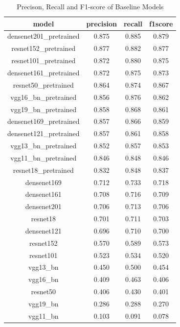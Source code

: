 \begin{table}[t]
  \centering
  \caption{Precison, Recall and F1-score of Baseline Models}
  \label{tabel:f1}
  \begin{tabular}{cccc}
    \hline
    \toprule
    model                   & precision & recall & f1score \\
    \midrule  %


    densenet201\_pretrained & 0.875     & 0.885  & 0.879   \\
    resnet152\_pretrained   & 0.877     & 0.882  & 0.877   \\
    resnet101\_pretrained   & 0.872     & 0.880  & 0.875   \\
    densenet161\_pretrained & 0.872     & 0.875  & 0.873   \\
    resnet50\_pretrained    & 0.864     & 0.874  & 0.867   \\
    vgg16\_bn\_pretrained   & 0.856     & 0.876  & 0.862   \\
    vgg19\_bn\_pretrained   & 0.858     & 0.868  & 0.861   \\
    densenet169\_pretrained & 0.857     & 0.866  & 0.859   \\
    densenet121\_pretrained & 0.857     & 0.861  & 0.858   \\
    vgg13\_bn\_pretrained   & 0.852     & 0.857  & 0.853   \\
    vgg11\_bn\_pretrained   & 0.846     & 0.848  & 0.846   \\
    resnet18\_pretrained    & 0.832     & 0.848  & 0.837   \\
    densenet169             & 0.712     & 0.733  & 0.718   \\
    densenet161             & 0.708     & 0.716  & 0.709   \\
    densenet201             & 0.706     & 0.713  & 0.706   \\
    resnet18                & 0.701     & 0.711  & 0.703   \\
    densenet121             & 0.696     & 0.710  & 0.700   \\
    resnet152               & 0.570     & 0.589  & 0.573   \\
    resnet101               & 0.523     & 0.534  & 0.520   \\
    vgg13\_bn               & 0.450     & 0.500  & 0.454   \\
    vgg16\_bn               & 0.409     & 0.463  & 0.406   \\
    resnet50                & 0.406     & 0.430  & 0.401   \\
    vgg19\_bn               & 0.286     & 0.288  & 0.270   \\
    vgg11\_bn               & 0.103     & 0.091  & 0.078   \\
    \bottomrule
  \end{tabular}
\end{table}

